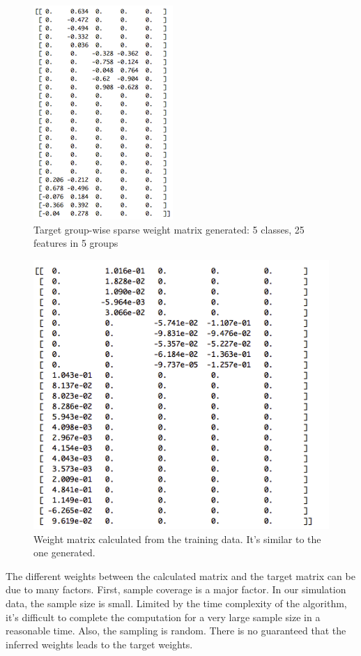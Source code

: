 \documentclass[11pt]{article}
\begin{document}
\begin{figure}[ht]
  \centering
  \includegraphics[width=.5\linewidth]{m1_img}
  \caption{Target group-wise sparse weight matrix generated: 5 classes, 25 features in 5 groups}
\end{figure}%

\begin{figure}[ht]
  \centering
  \includegraphics[width=.9\linewidth]{m2_img}
  \caption{Weight matrix calculated from the training data. It's similar to the one generated.}
\end{figure}


The different weights between the calculated matrix and the target matrix can be due to many factors. First, sample coverage is a major factor. In our simulation data, the sample size is small. Limited by the time complexity of the algorithm, it's difficult to complete the computation for a very large sample size in a reasonable time. Also, the sampling is random. There is no guaranteed that the inferred weights leads to the target weights. \\   
\end{document}
